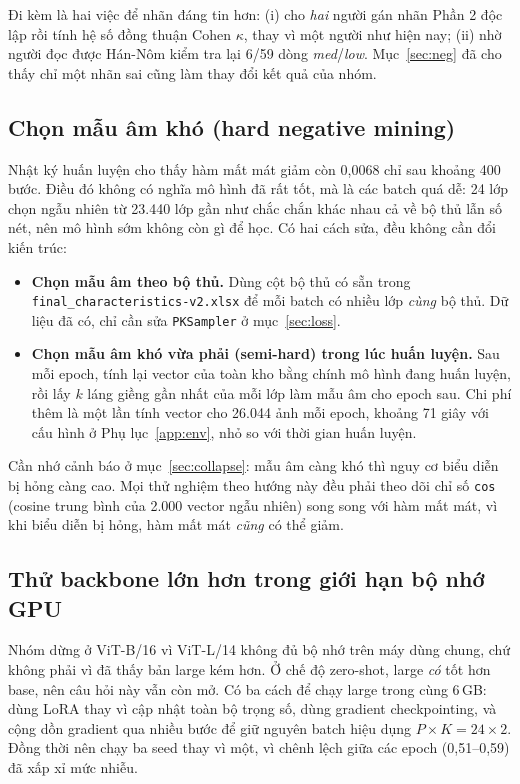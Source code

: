 \documentclass[conference,a4paper]{IEEEtran}
\newcommand{\code}[1]{{\small\texttt{#1}}}
\begin{document}
Đi kèm là hai việc để nhãn đáng tin hơn: (i) cho \emph{hai} người gán nhãn Phần 2 độc lập rồi tính hệ
số đồng thuận Cohen $\kappa$, thay vì một người như hiện nay; (ii) nhờ người đọc được Hán-Nôm kiểm tra
lại 6/59 dòng \emph{med}/\emph{low}. Mục~\ref{sec:neg} đã cho thấy chỉ một nhãn sai cũng làm thay đổi
kết quả của nhóm.

\subsection{Chọn mẫu âm khó (hard negative mining)}

Nhật ký huấn luyện cho thấy hàm mất mát giảm còn 0,0068 chỉ sau khoảng 400 bước. Điều đó không có
nghĩa mô hình đã rất tốt, mà là các batch quá dễ: 24 lớp chọn ngẫu nhiên từ 23.440 lớp gần như chắc
chắn khác nhau cả về bộ thủ lẫn số nét, nên mô hình sớm không còn gì để học. Có hai cách sửa, đều không
cần đổi kiến trúc:

\begin{itemize}
  \item \textbf{Chọn mẫu âm theo bộ thủ.} Dùng cột bộ thủ có sẵn trong
        \code{final\_characteristics-v2.xlsx} để mỗi batch có nhiều lớp \emph{cùng} bộ thủ. Dữ liệu
        đã có, chỉ cần sửa \code{PKSampler} ở mục~\ref{sec:loss}.
  \item \textbf{Chọn mẫu âm khó vừa phải (semi-hard) trong lúc huấn luyện.} Sau mỗi epoch, tính lại
        vector của toàn kho bằng chính mô hình đang huấn luyện, rồi lấy $k$ láng giềng gần nhất của mỗi
        lớp làm mẫu âm cho epoch sau. Chi phí thêm là một lần tính vector cho 26.044 ảnh mỗi epoch,
        khoảng 71 giây với cấu hình ở Phụ lục~\ref{app:env}, nhỏ so với thời gian huấn luyện.
\end{itemize}

Cần nhớ cảnh báo ở mục~\ref{sec:collapse}: mẫu âm càng khó thì nguy cơ biểu diễn bị hỏng càng cao. Mọi
thử nghiệm theo hướng này đều phải theo dõi chỉ số \code{cos} (cosine trung bình của 2.000 vector ngẫu
nhiên) song song với hàm mất mát, vì khi biểu diễn bị hỏng, hàm mất mát \emph{cũng} có thể giảm.

\subsection{Thử backbone lớn hơn trong giới hạn bộ nhớ GPU}

Nhóm dừng ở ViT-B/16 vì ViT-L/14 không đủ bộ nhớ trên máy dùng chung, chứ không phải vì đã thấy bản
large kém hơn. Ở chế độ zero-shot, large \emph{có} tốt hơn base, nên câu hỏi này vẫn còn mở. Có ba
cách để chạy large trong cùng 6\,GB: dùng LoRA thay vì cập nhật toàn bộ trọng số, dùng gradient
checkpointing, và cộng dồn gradient qua nhiều bước để giữ nguyên batch hiệu dụng $P \times K = 24
\times 2$. Đồng thời nên chạy ba seed thay vì một, vì chênh lệch giữa các epoch (0,51--0,59) đã xấp
xỉ mức nhiễu.
\end{document}
